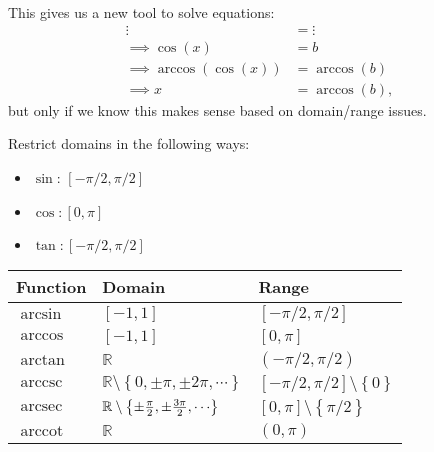 \begin{remark}

This gives us a new tool to solve equations:
\begin{align*}
\vdots &= \vdots \\
\implies \cos(x) &= b \\
\implies \arccos(\cos(x)) &= \arccos(b) \\
\implies x &= \arccos(b)
,\end{align*}
but only if we know this makes sense based on domain/range issues.

\end{remark}

\begin{proposition}

Restrict domains in the following ways:

\begin{itemize}
\tightlist
\item
  \(\sin\): \([-\pi/2, \pi/2]\)
\item
  \(\cos: [0, \pi]\)
\item
  \(\tan: [-\pi/2, \pi/2]\)
\end{itemize}

\begin{longtable}[]{@{}
  >{\raggedright\arraybackslash}p{}
  >{\raggedright\arraybackslash}p{}
  >{\raggedright\arraybackslash}p{}@{}}
\toprule
Function & Domain & Range \\
\midrule
\endhead
\(\arcsin\) & \([-1, 1]\) & \([-\pi/2, \pi /2]\) \\
\(\arccos\) & \([-1, 1]\) & \([0, \pi]\) \\
\(\arctan\) & \({\mathbb{R}}\) & \((-\pi/2, \pi/2)\) \\
\(\operatorname{arccsc}\) &
\({\mathbb{R}}\setminus\left\{{0, \pm {\pi}, \pm{2\pi}, \cdots}\right\}\)
& \([-\pi/2, \pi/2]\setminus\left\{{0}\right\}\) \\
\(\operatorname{arcsec}\) &
\({\mathbb{R}}\setminus\left\{{\pm {\pi \over 2}, \pm{3\pi \over 2}, \cdots}\right\}\)
& \([0, \pi]\setminus\left\{{\pi/2}\right\}\) \\
\(\operatorname{arccot}\) & \({\mathbb{R}}\) & \((0, \pi)\) \\
\bottomrule
\end{longtable}

\end{proposition}

